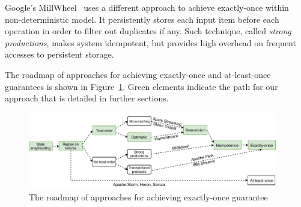 Google's MillWheel~\cite{Akidau:2013:MFS:2536222.2536229} uses a different approach to achieve exactly-once within non-deterministic model. It persistently stores each input item before each operation in order to filter out duplicates if any. Such technique, called {\em strong productions}, makes system idempotent, but provides high overhead on frequent accesses to persistent storage.

The roadmap of approaches for achieving exactly-once and at-least-once guarantees is shown in Figure~\ref{roadmap}. Green elements indicate the path for our approach that is detailed in further sections.

\begin{figure}[htbp]
  \centering
  \includegraphics[width=0.97\textwidth]{pics/roadmap}
  \caption{The roadmap of approaches for achieving exactly-once guarantee}
  \label {roadmap}
\end{figure}



